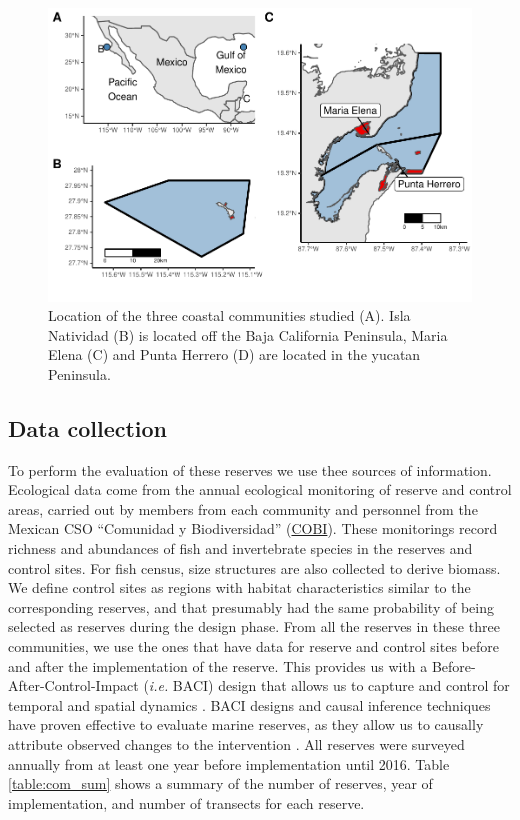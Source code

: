 \documentclass{frontiersSCNS}
\theoremstyle{definition}
\theoremstyle{definition}
\theoremstyle{definition}
\theoremstyle{remark}
\begin{document}
\begin{figure}
\centering
\includegraphics{Villasenor-Derbez_files/figure-latex/unnamed-chunk-1-1.pdf}
\caption{\label{fig:unnamed-chunk-1}\label{fig:map}Location of the three
coastal communities studied (A). Isla Natividad (B) is located off the
Baja California Peninsula, Maria Elena (C) and Punta Herrero (D) are
located in the yucatan Peninsula.}
\end{figure}

\subsection{Data collection}\label{data-collection}

To perform the evaluation of these reserves we use thee sources of
information. Ecological data come from the annual ecological monitoring
of reserve and control areas, carried out by members from each community
and personnel from the Mexican CSO ``Comunidad y Biodiversidad''
(\href{www.cobi.org.mx}{COBI}). These monitorings record richness and
abundances of fish and invertebrate species in the reserves and control
sites. For fish census, size structures are also collected to derive
biomass. We define control sites as regions with habitat characteristics
similar to the corresponding reserves, and that presumably had the same
probability of being selected as reserves during the design phase. From
all the reserves in these three communities, we use the ones that have
data for reserve and control sites before and after the implementation
of the reserve. This provides us with a Before-After-Control-Impact
(\emph{i.e.} BACI) design that allows us to capture and control for
temporal and spatial dynamics \citep{depalma_2018,ferraro_2006-oW}. BACI
designs and causal inference techniques have proven effective to
evaluate marine reserves, as they allow us to causally attribute
observed changes to the intervention
\citep{moland_2013-VP,Villasenor-Derbez_2018}. All reserves were
surveyed annually from at least one year before implementation until
2016. Table \ref{table:com_sum} shows a summary of the number of
reserves, year of implementation, and number of transects for each
reserve.
\end{document}
